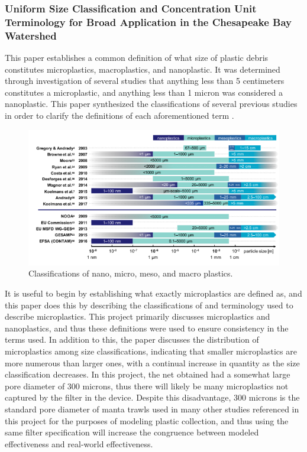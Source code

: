 \documentclass[fleqn,10pt]{SelfArx} %
\begin{document}
	\subsubsection*{Uniform Size Classification and Concentration Unit Terminology for Broad Application in the Chesapeake Bay Watershed}
	This paper establishes a common definition of what size of plastic debris constitutes microplastics, macroplastics, and nanoplastic. It was determined through investigation of several studies  that anything less than 5 centimeters constitutes a microplastic, and anything less than 1 micron was considered a nanoplastic. This paper synthesized the classifications of several previous studies in order to clarify the definitions of each aforementioned term \cite{TetraTech}.
	\begin{figure}[h]
		\centering
		\includegraphics[width=\linewidth]{Figures/TetraTech.png}
		\caption[MP Size Classes]{Classifications of nano, micro, meso, and macro plastics.}
		\label{fig:TetraTech}
	\end{figure}
	It is useful to begin by establishing what exactly microplastics are defined as, and this paper does this by describing the classifications of and terminology used to describe microplastics. This project primarily discusses microplastics and nanoplastics, and thus these definitions were used to ensure consistency in the terms used. In addition to this, the paper discusses the distribution of microplastics among size classifications, indicating that smaller microplastics are more numerous than larger ones, with a continual increase in quantity as the size classification decreases. In this project, the net obtained had a somewhat large pore diameter of 300 microns, thus there will likely be many microplastics not captured by the filter in the device. Despite this disadvantage, 300 microns is the standard pore diameter of manta trawls used in many other studies referenced in this project for the purposes of modeling plastic collection, and thus using the same filter specification will increase the congruence between modeled effectiveness and real-world effectiveness.
\end{document}
